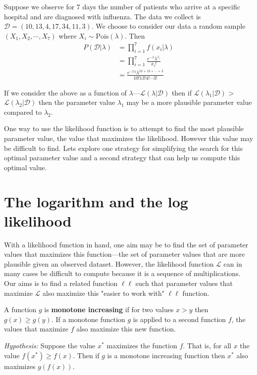 \ex Suppose we observe for 7 days the number of patients who arrive at a specific hospital and are diagnosed with influenza. The data we collect is $\mathcal{D} = (10,13,4,17,34,11,3)$. We choose to consider our data a random sample $(X_{1},X_{2},\cdots,X_{7})$ where $X_{i} \sim \text{Pois}(\lambda)$.
Then
\begin{align}
    P(\mathcal{D} | \lambda) &= \prod_{i=1}^{7} f( x_{i} | \lambda) \\ 
                             &= \prod_{i=1}^{7} \frac{e^{-\lambda} \lambda^{x_{i}}}{x_{i} !} \\
                             &= \frac{e^{-7\lambda} \lambda^{10+13+\cdots+3}}{10! 13! 4! \cdots 3!}
\end{align} 

If we consider the above as a function of $\lambda$---$\mathcal{L}(\lambda | \mathcal{D})$ then if $\mathcal{L}(\lambda_{1} | \mathcal{D})$ > $\mathcal{L}(\lambda_{2} | \mathcal{D})$ then the parameter value $\lambda_{1}$ may be a more plausible parameter value compared to $\lambda_{2}$. 

One way to use the likelihood function is to attempt to find the most plausible parameter value, the value that maximizes the likelihood. 
However this value may be difficult to find. 
Lets explore one strategy for simplifying the search for this optimal parameter value and a second strategy that can help us compute this optimal value.

\section{ The logarithm and the log likelihood }
With a likelihood function in hand, one aim may be to find the set of parameter values that maximizes this function---the set of parameter values that are more plausible given an observed dataset. 
However, the likelihood function $\mathcal{L}$ can in many cases be difficult to compute because it is a sequence of multiplications.
Our aims is to find a related function $\ell \ell$ such that parameter values that maximize $\mathcal{L}$ also maximize this "easier to work with" $\ell \ell$ function. 

A function $g$ is \textbf{monotone increasing} if for two values $x>y$ then $g(x) \geq g(y)$. 
If a monotone function $g$ is applied to a second function $f$, the values that maximize $f$ also maximize this new function. 

\textit{Hypothesis:} 
Suppose the value $x^{*}$ maximizes the function $f$.
That is, for all $x$ the value $f(x^{*}) \geq f(x)$. 
Then if $g$ is a monotone increasing function then $x^{*}$ also maximizes $g(f(x))$.

